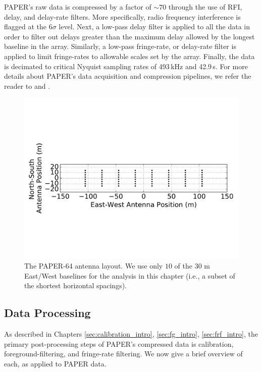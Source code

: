 PAPER's raw data is compressed by a factor of $\sim70$ through the use of RFI, delay, and delay-rate filters. More specifically, radio frequency interference is flagged at the $6\sigma$ level. Next, a low-pass delay filter is applied to all the data in order to filter out delays greater than the maximum delay allowed by the longest baseline in the array. Similarly, a low-pass fringe-rate, or delay-rate filter is applied to limit fringe-rates to allowable scales set by the array. Finally, the data is decimated to critical Nyquist sampling rates of 493\,kHz and 42.9\,s. For more details about PAPER's data acquisition and compression pipelines, we refer the reader to \citet{parsons_et_al2010} and .

\begin{figure}
    \centering
    \includegraphics[trim={0cm 0cm 0cm 0cm},width=\columnwidth]{plots/ant_layout_aspect.pdf}
    \caption{The PAPER-64 antenna layout. We use only $10$ of the $30$ m East/West baselines for the analysis in this 
chapter (i.e., a subset of the shortest horizontal spacings).}
    \label{fig:ant_layout}
\end{figure}

\subsection{Data Processing}
\label{sec:PSA64_processing}

As described in Chapters \ref{sec:calibration_intro}, \ref{sec:fg_intro}, \ref{sec:frf_intro}, the primary post-processing steps of PAPER's compressed data is calibration, foreground-filtering, and fringe-rate filtering. We now give a brief overview of each, as applied to PAPER data.

